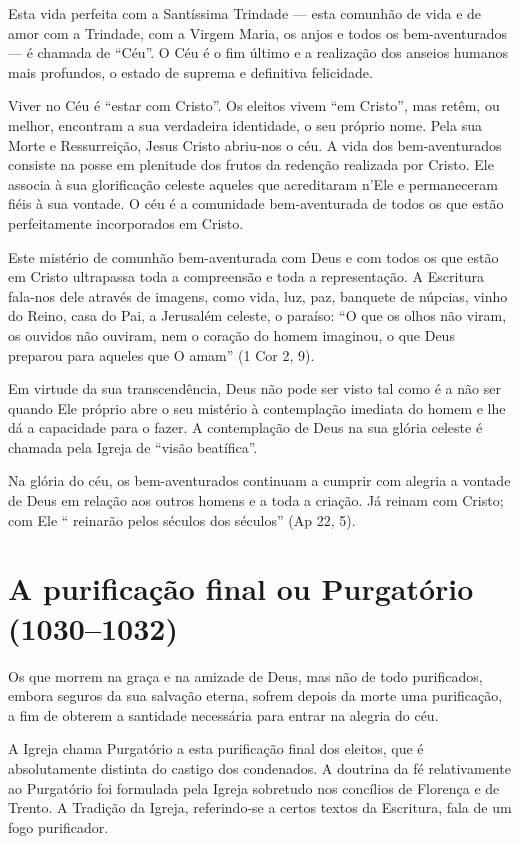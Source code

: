 Esta vida perfeita com a Santíssima Trindade --- esta comunhão de vida e de amor com a Trindade, com a Virgem Maria, os anjos e todos os bem-aventurados --- é chamada de ``Céu''. O Céu é o fim último e a realização dos anseios humanos mais profundos, o estado de suprema e definitiva felicidade.

Viver no Céu é ``estar com Cristo''. Os eleitos vivem ``em Cristo'', mas retêm, ou melhor, encontram a sua verdadeira identidade, o seu próprio nome. Pela sua Morte e Ressurreição, Jesus Cristo abriu-nos o céu. A vida dos bem-aventurados consiste na posse em plenitude dos frutos da redenção realizada por Cristo. Ele associa à sua glorificação celeste aqueles que acreditaram n'Ele e permaneceram fiéis à sua vontade. O céu é a comunidade bem-aventurada de todos os que estão perfeitamente incorporados em Cristo.

Este mistério de comunhão bem-aventurada com Deus e com todos os que estão em Cristo ultrapassa toda a compreensão e toda a representação. A Escritura fala-nos dele através de imagens, como vida, luz, paz, banquete de núpcias, vinho do Reino, casa do Pai, a Jerusalém celeste, o paraíso: ``O que os olhos não viram, os ouvidos não ouviram, nem o coração do homem imaginou, o que Deus preparou para aqueles que O amam'' (1 Cor 2, 9).

Em virtude da sua transcendência, Deus não pode ser visto tal como é a não ser quando Ele próprio abre o seu mistério à contemplação imediata do homem e lhe dá a capacidade para o fazer. A contemplação de Deus na sua glória celeste é chamada pela Igreja de ``visão beatífica''.

Na glória do céu, os bem-aventurados continuam a cumprir com alegria a vontade de Deus em relação aos outros homens e a toda a criação. Já reinam com Cristo; com Ele `` reinarão pelos séculos dos séculos'' (Ap 22, 5).

\section{A purificação final ou Purgatório (1030--1032)}

Os que morrem na graça e na amizade de Deus, mas não de todo purificados, embora seguros da sua salvação eterna, sofrem depois da morte uma purificação, a fim de obterem a santidade necessária para entrar na alegria do céu.

A Igreja chama Purgatório a esta purificação final dos eleitos, que é absolutamente distinta do castigo dos condenados. A doutrina da fé relativamente ao Purgatório foi formulada pela Igreja sobretudo nos concílios de Florença e de Trento. A Tradição da Igreja, referindo-se a certos textos da Escritura, fala de um fogo purificador.

